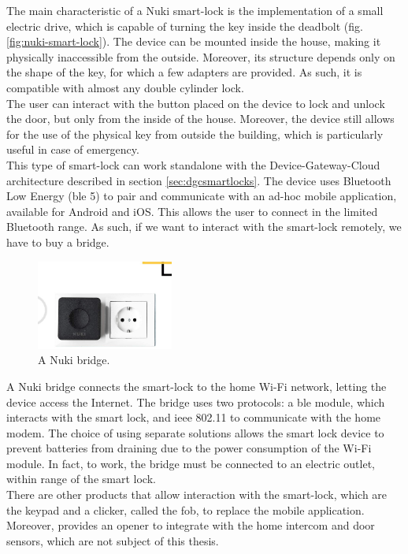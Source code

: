 The main characteristic of a Nuki smart-lock is the implementation of a small electric drive, which is capable of turning the key inside the deadbolt (fig. \ref{fig:nuki-smart-lock}). The device can be mounted inside the house, making it physically inaccessible from the outside. Moreover, its structure depends only on the shape of the key, for which a few adapters are provided. As such, it is compatible with almost any double cylinder lock.
\\ The user can interact with the button placed on the device to lock and unlock the door, but only from the inside of the house. Moreover, the device still allows for the use of the physical key from outside the building, which is particularly useful in case of emergency. 
\\ This type of smart-lock can work standalone with the Device-Gateway-Cloud architecture described in section \ref{sec:dgcsmartlocks}. The device uses Bluetooth Low Energy (\acrshort{ble} 5) to pair and communicate with an ad-hoc mobile application, available for Android and iOS. This allows the user to connect in the limited Bluetooth range. As such, if we want to interact with the smart-lock remotely, we have to buy a bridge. \\

\begin{figure}
    \includegraphics[width=0.4\textwidth, frame]{figures/Nuki-Serratura-Intelligente-4.jpg}
    \caption{A Nuki bridge.}
    \label{fig:nuki-bridge}
\end{figure}

A Nuki bridge connects the smart-lock to the home Wi-Fi network, letting the device access the Internet. The bridge uses two protocols: a \acrshort{ble} module, which interacts with the smart lock, and \acrshort{ieee} 802.11 to communicate with the home modem. The choice of using separate solutions allows the smart lock device to prevent batteries from draining due to the power consumption of the Wi-Fi module. In fact, to work, the bridge must be connected to an electric outlet, within range of the smart lock. \\
There are other products that allow interaction with the smart-lock, which are the keypad and a clicker, called the fob, to replace the mobile application. Moreover, provides an opener to integrate with the home intercom and door sensors, which are not subject of this thesis.

